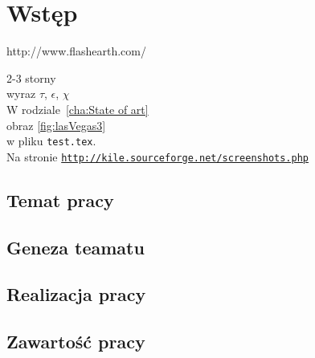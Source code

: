 \chapter{Wstęp}
\label{cha:wstep}

http://www.flashearth.com/

2-3 storny\\
wyraz $\tau$, $\epsilon$, $\chi$\\
W rodziale~\ref{cha:State of art}\\
obraz \ref{fig:lasVegas3}\\
w pliku \texttt{test.tex}.\\
Na stronie \underline{\texttt{http://kile.sourceforge.net/screenshots.php}}\\

\section{Temat pracy}
\label{sec:tematPracy}

\section{Geneza teamatu}
\label{sec:geneza}

\section{Realizacja pracy}
\label{sec:realizacja}

\section{Zawartość pracy}
\label{sec:zawartoscPracy}


















